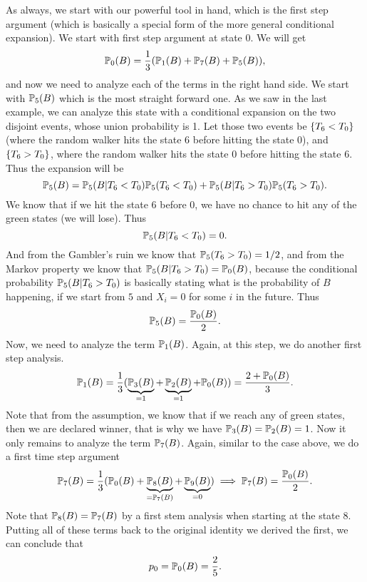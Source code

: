 \begin{solution}
	As always, we start with our powerful tool in hand, which is the first step argument (which is basically a special form of the more general conditional expansion). We start with first step argument at state $0$. We will get
	\[ \mathbb{P}_0(B) = \frac{1}{3} (\mathbb{P}_1(B) + \mathbb{P}_7(B) + \mathbb{P}_5(B) ), \]
	and now we need to analyze each of the terms in the right hand side. We start with $\mathbb{P}_5(B)$ which is the most straight forward one. As we saw in the last example, we can analyze this state with a conditional expansion on the two disjoint events, whose union probability is 1. Let those two events be $\{T_6 < T_0\}$ (where the random walker hits the state $6$ before hitting the state $0$), and $\{T_6 > T_0\}$, where the random walker hits the state $0$ before hitting the state $6$. Thus the expansion will be
	\[ \mathbb{P}_5(B) = \mathbb{P}_5(B|T_6 < T_0) \mathbb{P}_5(T_6 < T_0) + \mathbb{P}_5(B|T_6 > T_0)\mathbb{P}_5(T_6 > T_0). \]
	We know that if we hit the state $6$ before $0$, we have no chance to hit any of the green states (we will lose). Thus
	\[ \mathbb{P}_5(B|T_6<T_0) = 0. \]
	And from the Gambler's ruin we know that $\mathbb{P}_5(T_6>T_0) = 1/2$, and from the Markov property we know that $\mathbb{P}_5(B|T_6>T_0) = \mathbb{P}_0(B)$, because the conditional probability $\mathbb{P}_5(B|T_6>T_0)$ is basically stating what is the probability of $B$ happening, if we start from $5$ and $X_i = 0$ for some $i$ in the future. Thus 
	\[ \mathbb{P}_5(B) = \frac{\mathbb{P}_0(B)}{2}. \]
	Now, we need to analyze the term $\mathbb{P}_1(B)$. Again, at this step, we do another first step analysis.
	\[  \mathbb{P}_1(B) = \frac{1}{3} (\underbrace{\mathbb{P}_3(B)}_{=1} + \underbrace{\mathbb{P}_2(B)}_{=1} +\mathbb{P}_0(B)) = \frac{2+\mathbb{P}_0(B)}{3}. \]
	Note that from the assumption, we know that if we reach any of green states, then we are declared winner, that is why we have $\mathbb{P}_3(B) = \mathbb{P}_2(B) = 1$. Now it only remains to analyze the term $\mathbb{P}_7(B)$. Again, similar to the case above, we do a first time step argument
	\[ \mathbb{P}_7(B) = \frac{1}{3} ( \mathbb{P}_0(B) + \underbrace{\mathbb{P}_8(B)}_{=\mathbb{P}_7(B)} + \underbrace{\mathbb{P}_9(B)}_{=0} ) \implies \mathbb{P}_7(B) = \frac{\mathbb{P}_0(B)}{2}.\]
	Note that $\mathbb{P}_8(B) = \mathbb{P}_7(B)$ by a first stem analysis when starting at the state $8$. Putting all of these terms back to the original identity we derived the first, we can conclude that 
	\[ p_0 = \mathbb{P}_0(B) = \frac{2}{5}. \]
\end{solution}

